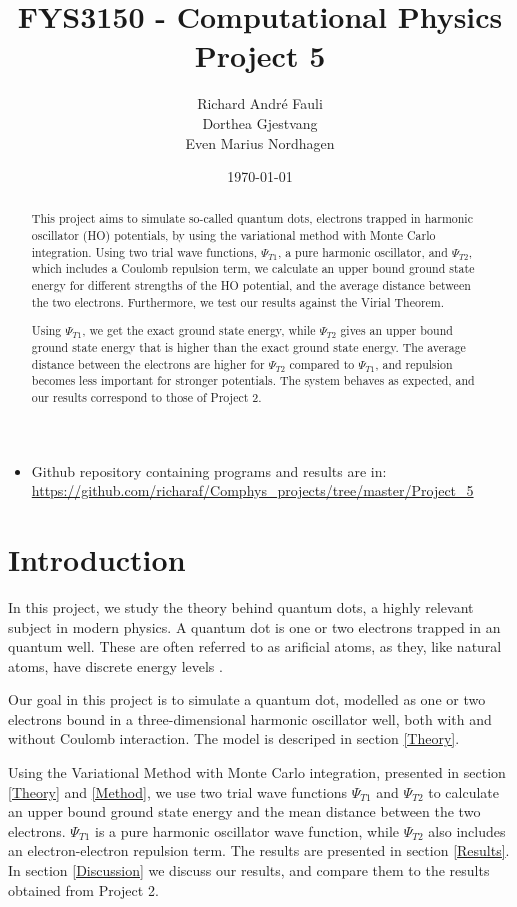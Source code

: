 \documentclass[norsk,a4paper,12pt]{article}
\title{FYS3150 - Computational Physics\\\vspace{2mm} \Large{Project 5}}
\author{\large Richard Andr\'e Fauli\\ Dorthea Gjestvang\\ Even Marius Nordhagen}
\date\today
\begin{document}
\maketitle
\begin{abstract}
This project aims to simulate so-called quantum dots, electrons trapped in harmonic oscillator (HO) potentials, by using the variational method with Monte Carlo integration. Using two trial wave functions, $\Psi_{T1}$, a pure harmonic oscillator, and $\Psi_{T2}$, which includes a Coulomb repulsion term, we calculate an upper bound ground state energy for different strengths of the HO potential, and the average distance between the two electrons. Furthermore, we test our results against the Virial Theorem.\par

Using $\Psi_{T1}$, we get the exact ground state energy, while $\Psi_{T2}$ gives an upper bound ground state energy that is higher than the exact ground state energy. The average distance between the electrons are higher for $\Psi_{T2}$ compared to $\Psi_{T1}$, and repulsion becomes less important for stronger potentials. The system behaves as expected, and our results correspond to those of Project 2.
\par 

\end{abstract}


\begin{itemize}
\item Github repository containing programs and results are in: \url{https://github.com/richaraf/Comphys_projects/tree/master/Project_5}
\end{itemize}


\section{Introduction}
In this project, we study the theory behind quantum dots, a highly relevant subject in modern physics. A quantum dot is one or two electrons trapped in an quantum well. These are often referred to as arificial atoms, as they, like natural atoms, have discrete energy levels \cite{Nature}.

Our goal in this project is to simulate a quantum dot, modelled as one or two electrons bound in a three-dimensional harmonic oscillator well, both with and without Coulomb interaction. The model is descriped in section \ref{Theory}. \par

Using the Variational Method with Monte Carlo integration, presented in section \ref{Theory} and \ref{Method}, we use two trial wave functions $\Psi_{T1}$ and $\Psi_{T2}$ to calculate an upper bound ground state energy and the mean distance between the two electrons. $\Psi_{T1}$ is a pure harmonic oscillator wave function, while $\Psi_{T2}$ also includes an electron-electron repulsion term. The results are presented in section \ref{Results}. In section \ref{Discussion} we discuss our results, and compare them to the results obtained from Project 2.
\end{document}
